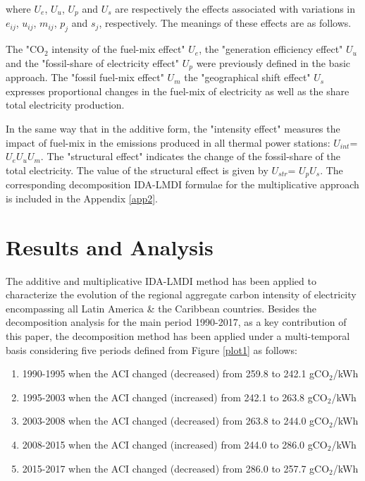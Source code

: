 \documentclass[energies,article,accept,moreauthors,12pt,a4paper]{mdpi} %
\begin{document}
where $U_{e}$, $U_{u}$,  $U_{p}$  and $U_{s}$ are respectively the effects associated with variations in $e_{ij}$, $u_{ij}$,  $m_{ij}$, $p_{j}$ and $s_{j}$, respectively. The meanings of these effects are as follows.

The "CO$_2$ intensity of the fuel-mix effect" $U_{e}$, the "generation efficiency effect" $U_{u}$ and the "fossil-share of electricity effect" $U_{p}$ were previously defined in the basic approach.  The "fossil fuel-mix effect" $U_{m}$ the "geographical shift effect" $U_{s}$ expresses proportional changes in the fuel-mix of electricity as well as the share total electricity production.

In the same way that in the additive form, the "intensity effect" measures the impact of fuel-mix in the emissions produced in all thermal power stations: $U_{int}$=$U_{e}   U_{u}  U_{m}$. The "structural effect" indicates the change of the fossil-share of the total electricity.  The value of the structural effect is given by $U_{str}$= $  U_{p}   U_{s}$. The corresponding decomposition IDA-LMDI formulae for the multiplicative approach is included in the Appendix \ref{app2}.



\section{Results and Analysis}  \label{sec5}


The additive and multiplicative IDA-LMDI method has been applied to characterize the evolution of the regional aggregate carbon intensity of electricity encompassing all Latin America \& the Caribbean countries. Besides the decomposition analysis for the main period 1990-2017, as a key contribution of this paper, the decomposition method has been applied under a multi-temporal basis considering five periods defined from Figure \ref{plot1} as follows:

\begin{enumerate}
  \item 1990-1995 when the ACI changed (decreased) from 259.8 to 242.1 gCO$_2$/kWh
  \item 1995-2003 when the ACI changed (increased) from 242.1 to 263.8 gCO$_2$/kWh
  \item 2003-2008 when the ACI changed (decreased) from 263.8 to 244.0 gCO$_2$/kWh
  \item 2008-2015 when the ACI changed (increased) from 244.0 to 286.0 gCO$_2$/kWh
  \item 2015-2017 when the ACI changed (decreased) from 286.0 to 257.7 gCO$_2$/kWh
\end{enumerate}
\end{document}
